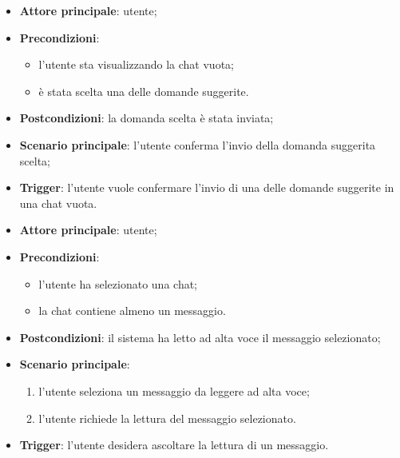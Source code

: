 \documentclass[10pt, a4paper]{article}
\begin{document}
    \begin{itemize}
        \item \textbf{Attore principale}: utente;
        \item \textbf{Precondizioni}:
            \begin{itemize}
                \item l’utente sta visualizzando la chat vuota;
                \item è stata scelta una delle domande suggerite.
            \end{itemize}
        \item \textbf{Postcondizioni}: la domanda scelta è stata inviata;
        \item \textbf{Scenario principale}: l’utente conferma l'invio della domanda suggerita scelta;
        \item \textbf{Trigger}: l’utente vuole confermare l'invio di una delle domande suggerite in una chat vuota.
    \end{itemize}

    \begin{itemize}
        \item \textbf{Attore principale}: utente;
        \item \textbf{Precondizioni}: 
        \begin{itemize}
            \item l’utente ha selezionato una chat; 
            \item la chat contiene almeno un messaggio.
        \end{itemize}
        \item \textbf{Postcondizioni}: il sistema ha letto ad alta voce il messaggio selezionato;
        \item \textbf{Scenario principale}:
        \begin{enumerate}
            \item l’utente seleziona un messaggio da leggere ad alta voce;
            \item l’utente richiede la lettura del messaggio selezionato.
        \end{enumerate} 
        \item \textbf{Trigger}: l’utente desidera ascoltare la lettura di un messaggio.
    \end{itemize}
\end{document}
